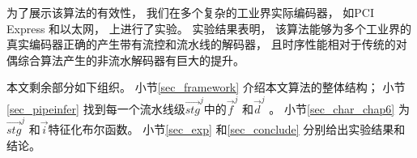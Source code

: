 为了展示该算法的有效性，
我们在多个复杂的工业界实际编码器，
如PCI Express  和以太网，
上进行了实验。
实验结果表明，
该算法能够为多个工业界的真实编码器正确的产生带有流控和流水线的解码器，
且时序性能相对于传统的对偶综合算法产生的非流水解码器有巨大的提升。



本文剩余部分如下组织。
小节\ref{sec_framework} 介绍本文算法的整体结构；
小节\ref{sec_pipeinfer} 找到每一个流水线级$\vec{stg}^j$中的$\vec{f}^j$ 和$\vec{d}^j$ 。
小节\ref{sec_char_chap6} 为$\vec{stg}^j$ 和$\vec{i}$特征化布尔函数。
小节\ref{sec_exp} 和\ref{sec_conclude} 分别给出实验结果和结论。


%
%
%
%
%
%
%
%
%
%
%
